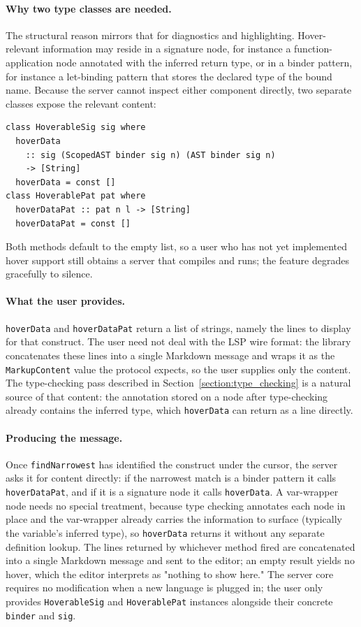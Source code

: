 \paragraph{Why two type classes are needed.}
The structural reason mirrors that for diagnostics and highlighting.
Hover-relevant information may reside in a signature node, for instance a function-application node annotated with the inferred return type, or in a binder pattern, for instance a let-binding pattern that stores the declared type of the bound name.
Because the server cannot inspect either component directly, two separate classes expose the relevant content:

\begin{verbatim}
class HoverableSig sig where
  hoverData
    :: sig (ScopedAST binder sig n) (AST binder sig n)
    -> [String]
  hoverData = const []
class HoverablePat pat where
  hoverDataPat :: pat n l -> [String]
  hoverDataPat = const []
\end{verbatim}

Both methods default to the empty list, so a user who has not yet implemented hover support still obtains a server that compiles and runs; the feature degrades gracefully to silence.

\paragraph{What the user provides.}
\texttt{hoverData} and \texttt{hoverDataPat} return a list of strings, namely the lines to display for that construct.
The user need not deal with the LSP wire format: the library concatenates these lines into a single Markdown message and wraps it as the \texttt{MarkupContent} value the protocol expects, so the user supplies only the content.
The type-checking pass described in Section~\ref{section:type_checking} is a natural source of that content: the annotation stored on a node after type-checking already contains the inferred type, which \texttt{hoverData} can return as a line directly.

\paragraph{Producing the message.}
Once \texttt{findNarrowest} has identified the construct under the cursor, the server asks it for content directly: if the narrowest match is a binder pattern it calls \texttt{hoverDataPat}, and if it is a signature node it calls \texttt{hoverData}.
A var-wrapper node needs no special treatment, because type checking annotates each node in place and the var-wrapper already carries the information to surface (typically the variable's inferred type), so \texttt{hoverData} returns it without any separate definition lookup.
The lines returned by whichever method fired are concatenated into a single Markdown message and sent to the editor; an empty result yields no hover, which the editor interprets as "nothing to show here."
The server core requires no modification when a new language is plugged in; the user only provides \texttt{HoverableSig} and \texttt{HoverablePat} instances alongside their concrete \texttt{binder} and \texttt{sig}.
